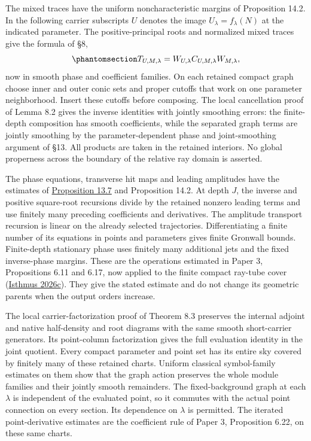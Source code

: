 \documentclass[
  english,
  11pt,
  reqno]{amsart}
\begin{document}
The mixed traces have the uniform noncharacteristic margins of
Proposition 14.2. In the following carrier subscripts \(U\) denotes the
image \(U_\lambda=f_\lambda(N)\) at the indicated parameter. The
positive-principal roots and normalized mixed traces give the formula of
§8,
\begin{equation}\protect\phantomsection\label{eq:family-relative-carrier-formula}{
T_{U,M,\lambda}
=W_{U,\lambda}C_{U,M,\lambda}W_{M,\lambda},
}\end{equation} now in smooth phase and coefficient families. On each
retained compact graph choose inner and outer conic sets and proper
cutoffs that work on one parameter neighborhood. Insert these cutoffs
before composing. The local cancellation proof of Lemma 8.2 gives the
inverse identities with jointly smoothing errors: the finite-depth
composition has smooth coefficients, while the separated graph terms are
jointly smoothing by the parameter-dependent phase and joint-smoothing
argument of §13. All products are taken in the retained interiors. No
global properness across the boundary of the relative ray domain is
asserted.

The phase equations, transverse hit maps and leading amplitudes have the
estimates of \hyperref[prop:family-wave-finite-estimates]{Proposition
13.7} and Proposition 14.2. At depth \(J\), the inverse and positive
square-root recursions divide by the retained nonzero leading terms and
use finitely many preceding coefficients and derivatives. The amplitude
transport recursion is linear on the already selected trajectories.
Differentiating a finite number of its equations in points and
parameters gives finite Gronwall bounds. Finite-depth stationary phase
uses finitely many additional jets and the fixed inverse-phase margins.
These are the operations estimated in Paper 3, Propositions 6.11 and
6.17, now applied to the finite compact ray-tube cover
(\hyperref[ref-IsthmusSmooth2026]{Isthmus 2026c}). They give the stated
estimate and do not change its geometric parents when the output orders
increase.

The local carrier-factorization proof of Theorem 8.3 preserves the
internal adjoint and native half-density and root diagrams with the same
smooth short-carrier generators. Its point-column factorization gives
the full evaluation identity in the joint quotient. Every compact
parameter and point set has its entire sky covered by finitely many of
these retained charts. Uniform classical symbol-family estimates on them
show that the graph action preserves the whole module families and their
jointly smooth remainders. The fixed-background graph at each
\(\lambda\) is independent of the evaluated point, so it commutes with
the actual point connection on every section. Its dependence on
\(\lambda\) is permitted. The iterated point-derivative estimates are
the coefficient rule of Paper 3, Proposition 6.22, on these same charts.
\end{document}
